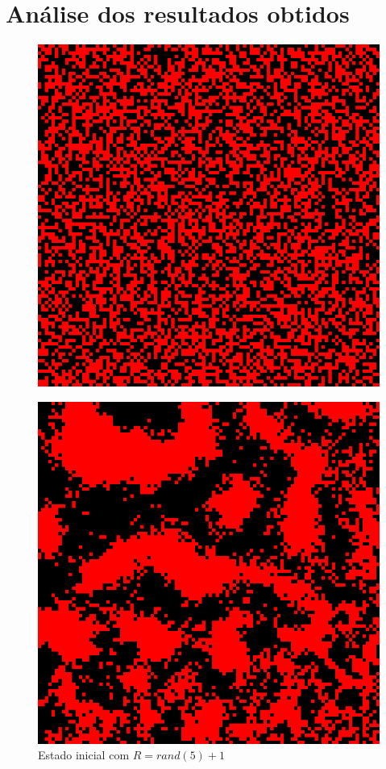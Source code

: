 \documentclass[conference]{IEEEtran}
\begin{document}
\section{Análise dos resultados obtidos}

\begin{figure}[H] 
  \begin{minipage}[b]{0.5\linewidth}
    \label{fig:r_rand}
    \centering
    \includegraphics[width=.8\linewidth]{resultados/5-0-rand.png} 
    \caption{Estado inicial com $R=rand(5)+1$} 
    \vspace{4ex}
  \end{minipage}%
  \begin{minipage}[b]{0.5\linewidth}
    \centering
    \includegraphics[width=.8\linewidth]{resultados/5-1-rand.png} 

\end{minipage}
\end{figure}
\end{document}
